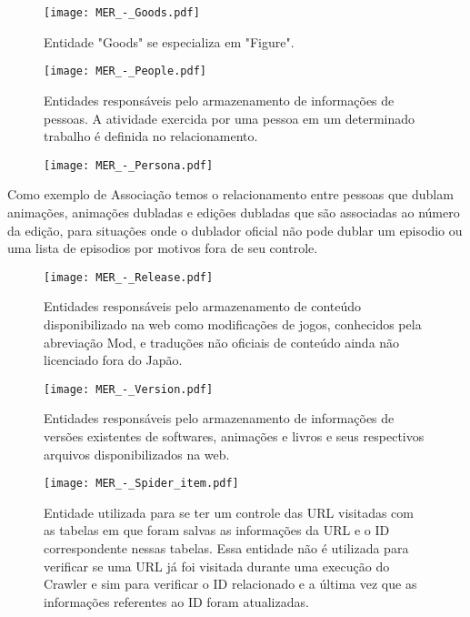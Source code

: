 \documentclass[12pt]{article}
\begin{document}
\begin{figure}[H]
\centering
\texttt{[image: MER\_-\_Goods.pdf]}
\caption{Entidade "Goods" se especializa em "Figure".} \label{hash}
\end{figure}

\begin{figure}[H]
\centering
\texttt{[image: MER\_-\_People.pdf]}
\caption{Entidades responsáveis pelo armazenamento de informações de pessoas. A atividade exercida por uma pessoa em um determinado trabalho é definida no relacionamento.} \label{hash}
\end{figure}

\begin{figure}[H]
\centering
\texttt{[image: MER\_-\_Persona.pdf]}
\caption{} \label{Persona}
\end{figure}


Como exemplo de Associação temos o relacionamento entre pessoas que dublam animações, animações dubladas e edições dubladas que são associadas ao número da edição, para situações onde o dublador oficial não pode dublar um episodio ou uma lista de episodios por motivos fora de seu controle. 

\begin{figure}[H]
\centering
\texttt{[image: MER\_-\_Release.pdf]}
\caption{Entidades responsáveis pelo armazenamento de conteúdo disponibilizado na web como modificações de jogos, conhecidos pela abreviação Mod, e traduções não oficiais de conteúdo ainda não licenciado fora do Japão.} \label{Release}
\end{figure}

\begin{figure}[H]
\centering
\texttt{[image: MER\_-\_Version.pdf]}
\caption{Entidades responsáveis pelo armazenamento de informações de versões existentes de softwares, animações e livros e seus respectivos arquivos disponibilizados na web.} \label{hash}
\end{figure}


\begin{figure}[H]
\centering
\texttt{[image: MER\_-\_Spider\_item.pdf]}
\caption{Entidade utilizada para se ter um controle das URL visitadas com as tabelas em que foram salvas as informações da URL e o ID correspondente nessas tabelas. Essa entidade não é utilizada para verificar se uma URL já foi visitada durante uma execução do Crawler e sim para verificar o ID relacionado e a última vez que as informações referentes ao ID foram atualizadas.} \label{hash}
\end{figure}
\end{document}
